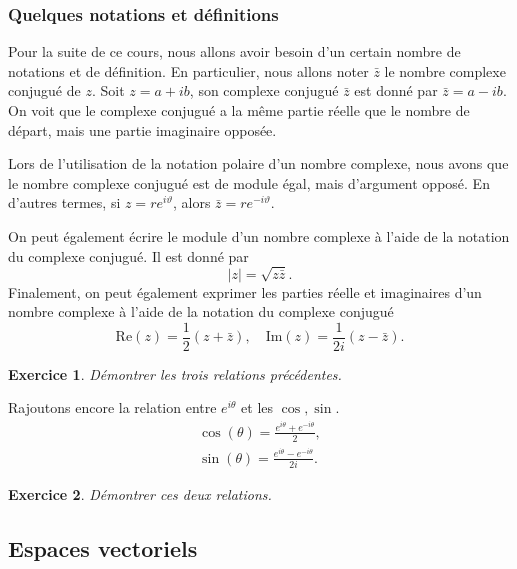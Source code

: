 \documentclass[a4paper,12pt]{book}
\newcommand{\zbar}{\bar{z}}
\renewcommand{\Re}{\mathrm{Re}}
\renewcommand{\Im}{\mathrm{Im}}
\newtheorem*{exercice}{Exercice}
\begin{document}
\subsubsection{Quelques notations et définitions}

Pour la suite de ce cours, nous allons avoir besoin d'un certain nombre 
de notations et de définition. En particulier, nous allons noter $\bar{z}$
le nombre complexe conjugu\'e de $z$. Soit $z=a+ib$, son complexe conjugué $\zbar$
est donné par $\zbar=a-ib$. On voit que le complexe conjugué a la même partie réelle
que le nombre de départ, mais une partie imaginaire opposée. 

Lors de l'utilisation de la notation polaire d'un nombre complexe, nous avons que le nombre complexe conjugué est 
de module égal, mais 
d'argument opposé. En d'autres termes, si $z=re^{i\vartheta}$, alors $\zbar=re^{-i\vartheta}$.


On peut également écrire le module d'un nombre complexe à l'aide de la notation 
du complexe conjugué. Il est donné par 
\begin{equation}
 |z|=\sqrt{z\zbar}.
\end{equation}
Finalement, on peut également exprimer les parties réelle et imaginaires d'un nombre complexe à l'aide 
de la notation du complexe conjugué
\begin{equation}
 \Re(z)=\frac{1}{2}(z+\zbar),\quad \Im(z)=\frac{1}{2i}(z-\zbar).
\end{equation}
\begin{exercice}
Démontrer les trois relations précédentes.
\end{exercice}
Rajoutons encore la relation entre $e^{i\theta}$ et les $\cos,\sin$. 
\begin{align}
 \cos(\theta)=\frac{e^{i\theta}+e^{-i\theta}}{2},\\
 \sin(\theta)=\frac{e^{i\theta}-e^{-i\theta}}{2i}.
\end{align}
\begin{exercice}
Démontrer ces deux relations.
\end{exercice}

\subsection{Espaces vectoriels}
\end{document}
